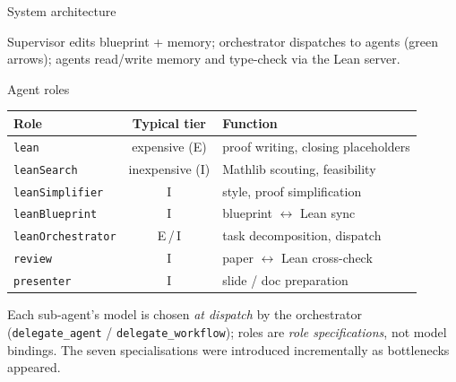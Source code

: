 \documentclass[aspectratio=169,10pt]{beamer}
\begin{document}
\begin{frame}{System architecture}
\begin{center}
    \end{center}
    \vspace{-0.4em}
    \textcolor{dimwhite}{\footnotesize Supervisor edits blueprint + memory; orchestrator dispatches to agents (green arrows); agents read/write memory and type-check via the Lean server.}
\end{frame}

\begin{frame}{Agent roles}
    \begin{center}
    \renewcommand{\arraystretch}{1.25}
    {\footnotesize
    \begin{tabular}{@{}l c l@{}}
        \toprule
        \textbf{Role} & \textbf{Typical tier} & \textbf{Function} \\
        \midrule
        \texttt{lean}             & \textcolor{softred}{expensive (E)}     & proof writing, closing placeholders \\
        \texttt{leanSearch}       & \textcolor{leangreen}{inexpensive (I)} & Mathlib scouting, feasibility \\
        \texttt{leanSimplifier}   & \textcolor{leangreen}{I}               & style, proof simplification \\
        \texttt{leanBlueprint}    & \textcolor{leangreen}{I}               & blueprint $\leftrightarrow$ Lean sync \\
        \texttt{leanOrchestrator} & E\,/\,I                                & task decomposition, dispatch \\
        \texttt{review}           & \textcolor{leangreen}{I}               & paper $\leftrightarrow$ Lean cross-check \\
        \texttt{presenter}        & \textcolor{leangreen}{I}               & slide / doc preparation \\
        \bottomrule
    \end{tabular}}
    \end{center}
    \vspace{0.5em}
    \textcolor{dimwhite}{\footnotesize Each sub-agent's model is chosen \emph{at dispatch} by the orchestrator (\texttt{delegate\_agent} / \texttt{delegate\_workflow}); roles are \emph{role specifications}, not model bindings. The seven specialisations were introduced incrementally as bottlenecks appeared.}
\end{frame}
\end{document}
